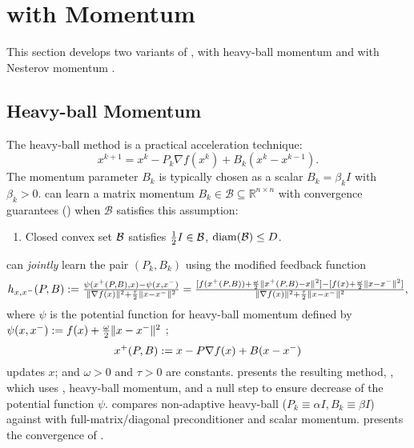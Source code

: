 \section{{\hdm} with Momentum} \label{sec:momentum}

This section develops two variants of {\hdm}, 
with heavy-ball momentum \cite{polyak1964some} and with Nesterov momentum \cite{nesterov1983method}.

\subsection{Heavy-ball Momentum}
\label{sec:heavyball}

The heavy-ball method is a practical acceleration technique: 
\begin{equation} \label{eqn:heavyball-update}
x^{k + 1} = x^k - P_k \nabla f (x^k) + B_k (x^k - x^{k - 1}).
\end{equation}
The momentum parameter $B_k$ is typically chosen as a scalar $B_k = \beta_k I$ with $\beta_k > 0$.
{\hdm} can learn a matrix momentum
$B_k \in \mathcal{B} \subseteq \mathbb{R}^{n \times n}$
with convergence guarantees () 
when $\mathcal{B}$ satisfies this assumption:
\begin{enumerate}[leftmargin=30pt,label=\textbf{A\arabic*:},ref=\rm{\textbf{A\arabic*}},start=5]
  \item Closed convex set $\mathcal{B}$ satisfies $\tfrac{1}{2} I\in \mathcal{B}$, $\mathrm{diam} (\mathcal{B}) \leq D$. \label{ABcal}
\end{enumerate}

{\hdm} can \emph{jointly} learn the pair $(P_k, B_k)$ using the modified feedback function
\begin{equation} \label{eqn:heavyball-feedback}
  h_{x, x^-} (P, B) := 
  \tfrac{\psi(x^{+}(P, B), x) - \psi(x, x^{-})}{\| \nabla f (x) \|^2 + \frac{\tau}{2} \| x - x^- \|^2}
  = \tfrac{[f (x^+(P, B)) + \frac{\omega}{2} \| x^+(P, B) - x \|^2] - [f (x) + \frac{\omega}{2} \| x - x^- \|^2]}{\| \nabla f (x) \|^2 + \frac{\tau}{2} \| x - x^- \|^2}, 
\end{equation}
where $\psi$ is the potential function for heavy-ball momentum defined by $\psi (x, x^-) := f (x) + \tfrac{\omega}{2} \| x - x^- \|^2$ \cite{danilova2020non}; \[x^{+}(P, B) := x - P \nabla f (x) + B (x - x^{-})\] updates $x$; and $\omega > 0$ and $ \tau > 0$ are constants.  presents the resulting method, \hdmhb, 
which uses {\hdm}, heavy-ball momentum, and a null step to ensure decrease of the potential function $\psi$.
 compares non-adaptive heavy-ball ($P_k \equiv  \alpha I, B_k \equiv \beta I$) against {\hdmhb} with full-matrix/diagonal preconditioner and scalar momentum.
  presents the convergence of {\hdmhb}. 

